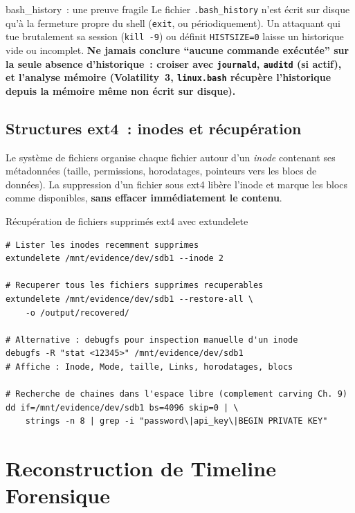 \begin{boiteRemarque}{bash\_history~: une preuve fragile}
Le fichier \texttt{.bash\_history} n'est écrit sur disque qu'à la
fermeture propre du shell (\texttt{exit}, ou périodiquement). Un
attaquant qui tue brutalement sa session (\texttt{kill~-9}) ou
définit \texttt{HISTSIZE=0} laisse un historique vide ou incomplet.
\textbf{Ne jamais conclure ``aucune commande exécutée'' sur la seule
absence d'historique~: croiser avec \texttt{journald},
\texttt{auditd} (si actif), et l'analyse mémoire (Volatility~3,
\texttt{linux.bash} récupère l'historique depuis la mémoire
même non écrit sur disque).}
\end{boiteRemarque}

\subsection{Structures ext4~: inodes et récupération}

Le système de fichiers  organise chaque
fichier autour d'un \textit{inode} contenant ses métadonnées
(taille, permissions, horodatages, pointeurs vers les blocs de données).
La suppression d'un fichier sous ext4 libère l'inode et marque les blocs
comme disponibles, \textbf{sans effacer immédiatement le contenu}.

\begin{boxoutils}{Récupération de fichiers supprimés ext4 avec extundelete}
\begin{lstlisting}[language=bash_forensique]
# Lister les inodes recemment supprimes
extundelete /mnt/evidence/dev/sdb1 --inode 2

# Recuperer tous les fichiers supprimes recuperables
extundelete /mnt/evidence/dev/sdb1 --restore-all \
    -o /output/recovered/

# Alternative : debugfs pour inspection manuelle d'un inode
debugfs -R "stat <12345>" /mnt/evidence/dev/sdb1
# Affiche : Inode, Mode, taille, Links, horodatages, blocs

# Recherche de chaines dans l'espace libre (complement carving Ch. 9)
dd if=/mnt/evidence/dev/sdb1 bs=4096 skip=0 | \
    strings -n 8 | grep -i "password\|api_key\|BEGIN PRIVATE KEY"
\end{lstlisting}
\end{boxoutils}

\section{Reconstruction de Timeline Forensique}
\label{sec:timeline}

